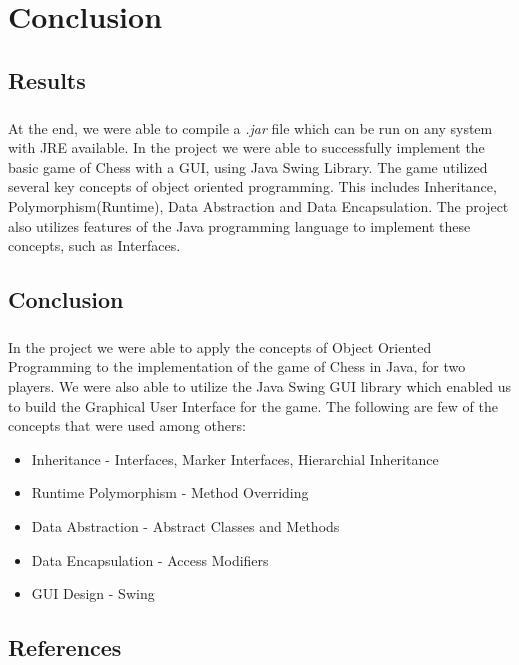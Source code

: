 \chapter{Conclusion}

\section{Results}
\paragraph{}
At the end, we were able to compile a \textit{.jar} file which can be run on any system with JRE available. In the project we were able to successfully implement the basic game of Chess with a GUI, using Java Swing Library. The game utilized several key concepts of object oriented programming. This includes Inheritance, Polymorphism(Runtime), Data Abstraction and Data Encapsulation. The project also utilizes features of the Java programming language to implement these concepts, such as Interfaces.

\section{Conclusion}
\paragraph{}
In the project we were able to apply the concepts of Object Oriented Programming to the implementation of the game of Chess in Java, for two players. We were also able to utilize the Java Swing GUI library which enabled us to build the Graphical User Interface for the game. The following are few of the concepts that were used among others:

\begin{itemize}
    \item Inheritance - Interfaces, Marker Interfaces, Hierarchial Inheritance
    \item Runtime Polymorphism - Method Overriding
    \item Data Abstraction - Abstract Classes and Methods
    \item Data Encapsulation - Access Modifiers
    \item GUI Design - Swing 
\end{itemize}

\section{References}
